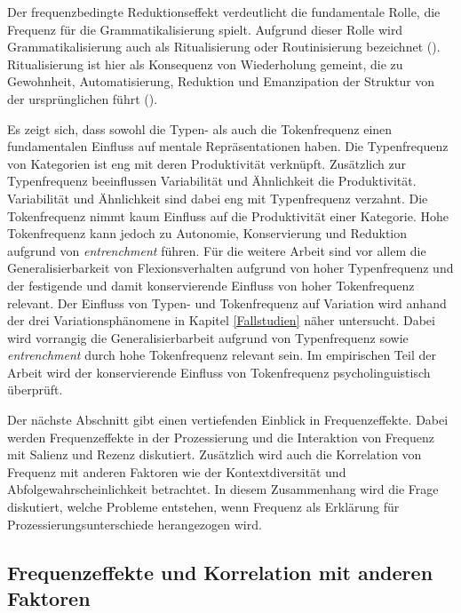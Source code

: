 \begin{sloppypar}
Der frequenzbedingte Reduktionseffekt verdeutlicht die fundamentale Rolle, die Frequenz für die Grammatikalisierung spielt. Aufgrund dieser Rolle wird Grammatikalisierung auch als Ritualisierung oder Routinisierung bezeichnet (\cites[603--604]{Bybee.2002}[189]{Detges.2002}). Ritualisierung ist hier als Konsequenz von Wiederholung gemeint, die zu Gewohnheit, Automatisierung, Reduktion und Emanzipation der Struktur von der ursprünglichen führt (\cite[4--8]{Haiman.1994}).
\end{sloppypar}

Es zeigt sich, dass sowohl die Typen- als auch die Tokenfrequenz einen fundamentalen Einfluss auf mentale Repräsentationen haben. Die Typenfrequenz von Kategorien ist eng mit deren Produktivität verknüpft. Zusätzlich zur Typenfrequenz beeinflussen Variabilität und Ähnlichkeit die Produktivität. Variabilität und Ähnlichkeit sind dabei eng mit Typenfrequenz verzahnt. Die Tokenfrequenz nimmt  kaum Einfluss auf die Produktivität einer Kategorie. Hohe Tokenfrequenz kann jedoch zu Autonomie, Konservierung und Reduktion aufgrund von \textit{entrenchment} führen. Für die weitere Arbeit sind vor allem die Generalisierbarkeit von Flexionsverhalten aufgrund von hoher Typenfrequenz und der festigende und damit konservierende Einfluss von hoher Tokenfrequenz relevant. Der Einfluss von Typen- und Tokenfrequenz auf Variation wird anhand der drei Variationsphänomene in Kapitel \ref{Fallstudien} näher untersucht. Dabei wird vorrangig die Generalisierbarbeit aufgrund von Typenfrequenz sowie  \textit{entrenchment} durch hohe Tokenfrequenz relevant sein. Im empirischen Teil der Arbeit wird der konservierende Einfluss von Tokenfrequenz psycholinguistisch überprüft.   

Der nächste Abschnitt gibt einen vertiefenden Einblick in Frequenzeffekte. Dabei werden Frequenzeffekte in der Prozessierung und die Interaktion von Frequenz mit Salienz und Rezenz diskutiert. Zusätzlich wird auch die Korrelation von Frequenz mit anderen Faktoren wie der Kontextdiversität und Abfolgewahrscheinlichkeit betrachtet. In diesem Zusammenhang wird die Frage diskutiert, welche Probleme entstehen, wenn Frequenz als Erklärung für Prozessierungsunterschiede herangezogen wird. 

\subsection{Frequenzeffekte und Korrelation mit anderen Faktoren}
\label{korrelation}
    
